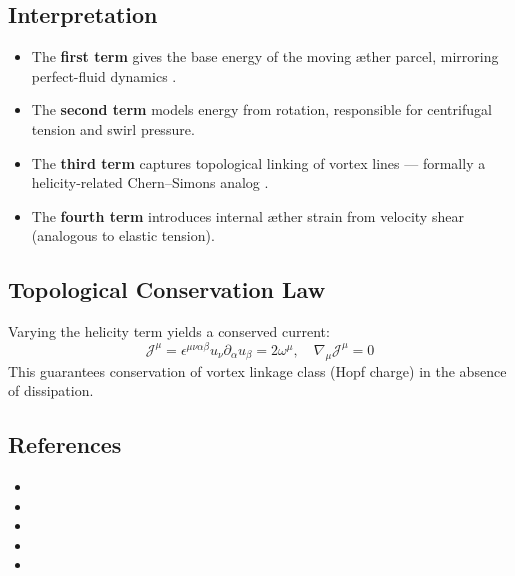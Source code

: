\documentclass[twocolumn,aps,pre,floatfix,nofootinbib]{revtex4-2}
\begin{document}
    \subsection*{Interpretation}

    \begin{itemize}
        \item The \textbf{first term} gives the base energy of the moving æther parcel, mirroring perfect-fluid dynamics \cite{schutz1970perfect}.
        \item The \textbf{second term} models energy from rotation, responsible for centrifugal tension and swirl pressure.
        \item The \textbf{third term} captures topological linking of vortex lines — formally a helicity-related Chern–Simons analog \cite{moffatt1969degree, arnold1998topological}.
        \item The \textbf{fourth term} introduces internal æther strain from velocity shear (analogous to elastic tension).
    \end{itemize}

    \subsection*{Topological Conservation Law}

    Varying the helicity term yields a conserved current:
    \[
        \mathcal{J}^\mu = \epsilon^{\mu\nu\alpha\beta} u_\nu \partial_\alpha u_\beta = 2 \omega^\mu,
        \quad \nabla_\mu \mathcal{J}^\mu = 0
    \]
    This guarantees conservation of vortex linkage class (Hopf charge) in the absence of dissipation.

    \subsection*{References}

    \begin{itemize}
        \item {}  %
        \item {} %
        \item {} %
        \item {} %
        \item {} %
    \end{itemize}
\end{document}
